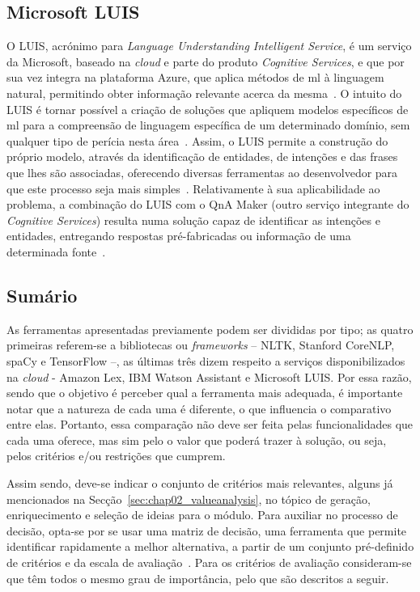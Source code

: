 \subsection{Microsoft LUIS}
O LUIS, acrónimo para \textit{Language Understanding Intelligent Service}, é um serviço da Microsoft, baseado na \textit{cloud} e parte do produto \textit{Cognitive Services}, e que por sua vez integra na plataforma Azure, que aplica métodos de \gls{ml} à linguagem natural, permitindo obter informação relevante acerca da mesma~\parencite{microsoft_luis_official}. O intuito do LUIS é tornar possível a criação de soluções que apliquem modelos específicos de \gls{ml} para a compreensão de linguagem específica de um determinado domínio, sem qualquer tipo de perícia nesta área~\parencite{luis_fast_easy_language_understanding}. Assim, o LUIS permite a construção do próprio modelo, através da identificação de entidades, de intenções e das frases que lhes são associadas, oferecendo diversas ferramentas ao desenvolvedor para que este processo seja mais simples~\parencite{microsoft_luis_official}. Relativamente à sua aplicabilidade ao problema, a combinação do LUIS com o QnA Maker (outro serviço integrante do \textit{Cognitive Services}) resulta numa solução capaz de identificar as intenções e entidades, entregando respostas pré-fabricadas ou informação de uma determinada fonte~\parencite{microsoft_luis_use_nl_processing_service}.

\subsection{Sumário}
As ferramentas apresentadas previamente podem ser divididas por tipo; as quatro primeiras referem-se a bibliotecas ou \textit{frameworks} -- NLTK, Stanford CoreNLP, spaCy e TensorFlow --, as últimas três dizem respeito a serviços disponibilizados na \textit{cloud} - Amazon Lex, IBM Watson Assistant e Microsoft LUIS. Por essa razão, sendo que o objetivo é perceber qual a ferramenta mais adequada, é importante notar que a natureza de cada uma é diferente, o que influencia o comparativo entre elas. Portanto, essa comparação não deve ser feita pelas funcionalidades que cada uma oferece, mas sim pelo o valor que poderá trazer à solução, ou seja, pelos critérios e/ou restrições que cumprem.

Assim sendo, deve-se indicar o conjunto de critérios mais relevantes, alguns já mencionados na Secção~\ref{sec:chap02_valueanalysis}, no tópico de geração, enriquecimento e seleção de ideias para o módulo. Para auxiliar no processo de decisão, opta-se por se usar uma matriz de decisão, uma ferramenta que permite identificar rapidamente a melhor alternativa, a partir de um conjunto pré-definido de critérios e da escala de avaliação~\parencite{decisions_engineering_design}.
Para os critérios de avaliação consideram-se que têm todos o mesmo grau de importância, pelo que são descritos a seguir.

